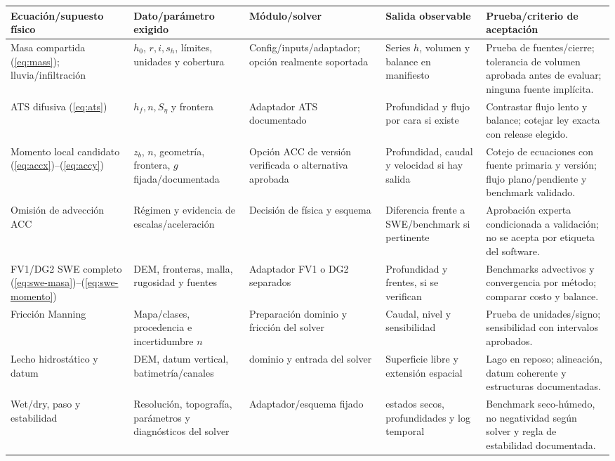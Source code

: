 \documentclass[11pt,a4paper]{article}
\begin{document}
\begin{landscape}
\small
\begin{longtable}{p{.18\linewidth}p{.18\linewidth}p{.18\linewidth}p{.17\linewidth}p{.22\linewidth}}
\toprule Ecuación/supuesto físico & Dato/parámetro exigido & Módulo/solver & Salida observable & Prueba/criterio de aceptación\\\midrule
\endhead
Masa compartida (\ref{eq:mass}); lluvia/infiltración & $h_0$, $r,i,s_h$, límites, unidades y cobertura & Config/inputs/adaptador; opción realmente soportada & Series $h$, volumen y balance en manifiesto & Prueba de fuentes/cierre; tolerancia de volumen aprobada antes de evaluar; ninguna fuente implícita.\\
ATS difusiva (\ref{eq:ats}) & $h_f,n,S_\eta$ y frontera & Adaptador ATS documentado & Profundidad y flujo por cara si existe & Contrastar flujo lento y balance; cotejar ley exacta con release elegido.\\
Momento local candidato (\ref{eq:accx})--(\ref{eq:accy}) & $z_b$, $n$, geometría, frontera, $g$ fijada/documentada & Opción ACC de versión verificada o alternativa aprobada & Profundidad, caudal y velocidad si hay salida & Cotejo de ecuaciones con fuente primaria y versión; flujo plano/pendiente y benchmark validado.\\
Omisión de advección ACC & Régimen y evidencia de escalas/aceleración & Decisión de física y esquema & Diferencia frente a SWE/benchmark si pertinente & Aprobación experta condicionada a validación; no se acepta por etiqueta del software.\\
FV1/DG2 SWE completo (\ref{eq:swe-masa})--(\ref{eq:swe-momento}) & DEM, fronteras, malla, rugosidad y fuentes & Adaptador FV1 o DG2 separados & Profundidad y frentes, si se verifican & Benchmarks advectivos y convergencia por método; comparar costo y balance.\\
Fricción Manning & Mapa/clases, procedencia e incertidumbre $n$ & Preparación dominio y fricción del solver & Caudal, nivel y sensibilidad & Prueba de unidades/signo; sensibilidad con intervalos aprobados.\\
Lecho hidrostático y datum & DEM, datum vertical, batimetría/canales & dominio y entrada del solver & Superficie libre y extensión espacial & Lago en reposo; alineación, datum coherente y estructuras documentadas.\\
Wet/dry, paso y estabilidad & Resolución, topografía, parámetros y diagnósticos del solver & Adaptador/esquema fijado & estados secos, profundidades y log temporal & Benchmark seco-húmedo, no negatividad según solver y regla de estabilidad documentada.\\

\end{longtable}
\end{landscape}
\end{document}

